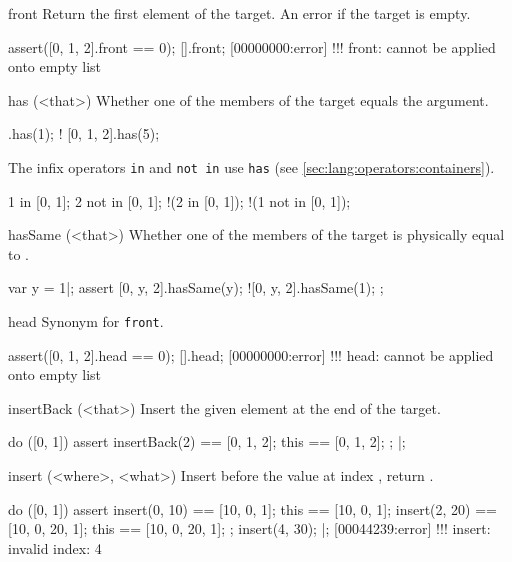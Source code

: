 \begin{urbiscriptapi}
\item[front]
  Return the first element of the target. An error if the target is
  empty.
\begin{urbiscript}
assert([0, 1, 2].front == 0);
[].front;
[00000000:error] !!! front: cannot be applied onto empty list
\end{urbiscript}

\item[has](<that>)
  Whether one of the members of the target equals the argument.

\begin{urbiassert}
[0, 1, 2].has(1);
! [0, 1, 2].has(5);
\end{urbiassert}

  The infix operators \lstinline|in| and \lstinline|not in| use
  \lstinline|has| (see \autoref{sec:lang:operators:containers}).

\begin{urbiassert}
  1 in     [0, 1];
  2 not in [0, 1];
!(2 in     [0, 1]);
!(1 not in [0, 1]);
\end{urbiassert}

\item[hasSame](<that>)
  Whether one of the members of the target is physically equal to
  .
\begin{urbiscript}
var y = 1|;
assert
{
   [0, y, 2].hasSame(y);
  ![0, y, 2].hasSame(1);
};
\end{urbiscript}

\item[head]
  Synonym for \lstinline|front|.
\begin{urbiscript}
assert([0, 1, 2].head == 0);
[].head;
[00000000:error] !!! head: cannot be applied onto empty list
\end{urbiscript}

\item[insertBack](<that>)
  Insert the given element at the end of the target.

\begin{urbiscript}
do ([0, 1])
{
  assert
  {
    insertBack(2) == [0, 1, 2];
    this          == [0, 1, 2];
  };
}|;
\end{urbiscript}

\item[insert](<where>, <what>)
  Insert  before the value at index , return
  \this.
\begin{urbiscript}
do ([0, 1])
{
  assert
  {
    insert(0, 10) == [10, 0, 1];
    this          == [10, 0, 1];
    insert(2, 20) == [10, 0, 20, 1];
    this          == [10, 0, 20, 1];
  };
  insert(4, 30);
}|;
[00044239:error] !!! insert: invalid index: 4
\end{urbiscript}


\end{urbiscriptapi}
